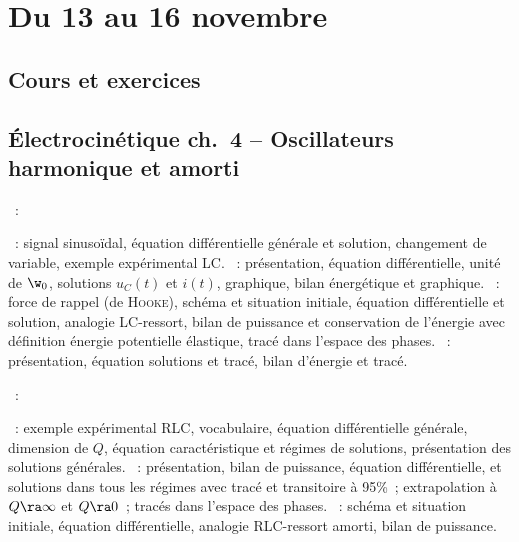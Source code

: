 \documentclass[a4paper, 12pt, final, garamond]{book}
\begin{document}
\setcounter{chapter}{6}

\chapter{Du 13 au 16 novembre}

\section{Cours et exercices}

\section*{Électrocinétique ch.\ 4 -- Oscillateurs harmonique et amorti}
\begin{enumerate}[label=\Roman*]
	~:
	\begin{enumerate}[label=\Alph*]
		~: signal sinusoïdal, équation différentielle
		générale et solution, changement de variable, exemple expérimental LC.
		~: présentation, équation
		différentielle, unité de $\w_0$, solutions $u_C(t)$ et $i(t)$, graphique,
		bilan énergétique et graphique.
		~: force de rappel (de \textsc{Hooke}),
		schéma et situation initiale, équation différentielle et solution, analogie
		LC-ressort, bilan de puissance et conservation de l'énergie avec définition
		énergie potentielle élastique, tracé dans l'espace des phases.
		~: présentation, équation solutions
		et tracé, bilan d'énergie et tracé.
	\end{enumerate}
	~:
	\begin{enumerate}[label=\Alph*]
		~: exemple expérimental RLC, vocabulaire, équation
		différentielle générale, dimension de $Q$, équation caractéristique et
		régimes de solutions, présentation des solutions générales.
		~: présentation, bilan de puissance,
		équation différentielle, et solutions dans tous les régimes avec tracé et
		transitoire à 95\%~; extrapolation à $Q \ra \infty$ et $Q \ra 0$~; tracés
		dans l'espace des phases.
		~:
		schéma et situation initiale, équation différentielle, analogie RLC-ressort
		amorti, bilan de puissance.
	\end{enumerate}
\end{enumerate}
\end{document}
